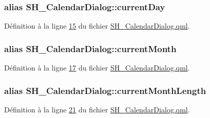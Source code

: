 \hypertarget{classSH__CalendarDialog_a2c0ae47d55757e17551d5d6ea5413bb9}{
\subsubsection[{current\-Day}]{\setlength{\rightskip}{0pt plus 5cm}alias S\-H\-\_\-\-Calendar\-Dialog\-::current\-Day}}\label{classSH__CalendarDialog_a2c0ae47d55757e17551d5d6ea5413bb9}


Définition à la ligne \hyperlink{SH__CalendarDialog_8qml_source_l00015}{15} du fichier \hyperlink{SH__CalendarDialog_8qml_source}{S\-H\-\_\-\-Calendar\-Dialog.\-qml}.

\hypertarget{classSH__CalendarDialog_a297eca7b6afa21350ff89a43580ff406}{
\subsubsection[{current\-Month}]{\setlength{\rightskip}{0pt plus 5cm}alias S\-H\-\_\-\-Calendar\-Dialog\-::current\-Month}}\label{classSH__CalendarDialog_a297eca7b6afa21350ff89a43580ff406}


Définition à la ligne \hyperlink{SH__CalendarDialog_8qml_source_l00017}{17} du fichier \hyperlink{SH__CalendarDialog_8qml_source}{S\-H\-\_\-\-Calendar\-Dialog.\-qml}.

\hypertarget{classSH__CalendarDialog_a9708f1f6b6cdcf136c533e206a29d98e}{
\subsubsection[{current\-Month\-Length}]{\setlength{\rightskip}{0pt plus 5cm}alias S\-H\-\_\-\-Calendar\-Dialog\-::current\-Month\-Length}}\label{classSH__CalendarDialog_a9708f1f6b6cdcf136c533e206a29d98e}


Définition à la ligne \hyperlink{SH__CalendarDialog_8qml_source_l00021}{21} du fichier \hyperlink{SH__CalendarDialog_8qml_source}{S\-H\-\_\-\-Calendar\-Dialog.\-qml}.

